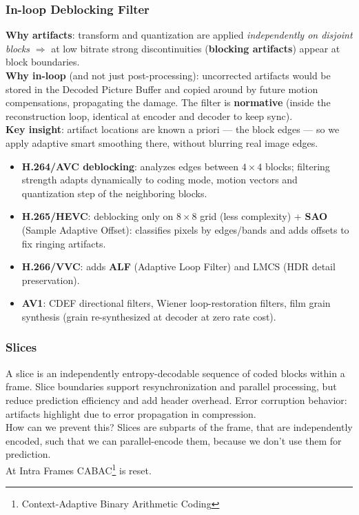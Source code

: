 \subsubsection{In-loop Deblocking Filter}
\textbf{Why artifacts}: transform and quantization are applied \emph{independently on disjoint blocks} $\Rightarrow$ at low bitrate strong discontinuities (\textbf{blocking artifacts}) appear at block boundaries.\\
\textbf{Why in-loop} (and not just post-processing): uncorrected artifacts would be stored in the Decoded Picture Buffer and copied around by future motion compensations, propagating the damage. The filter is \textbf{normative} (inside the reconstruction loop, identical at encoder and decoder to keep sync).\\
\textbf{Key insight}: artifact locations are known a priori --- the block edges --- so we apply adaptive smart smoothing there, without blurring real image edges.
\begin{itemize}
    \item \textbf{H.264/AVC deblocking}: analyzes edges between $4\times4$ blocks; filtering strength adapts dynamically to coding mode, motion vectors and quantization step of the neighboring blocks.
    \item \textbf{H.265/HEVC}: deblocking only on $8\times8$ grid (less complexity) + \textbf{SAO} (Sample Adaptive Offset): classifies pixels by edges/bands and adds offsets to fix ringing artifacts.
    \item \textbf{H.266/VVC}: adds \textbf{ALF} (Adaptive Loop Filter) and LMCS (HDR detail preservation).
    \item \textbf{AV1}: CDEF directional filters, Wiener loop-restoration filters, film grain synthesis (grain re-synthesized at decoder at zero rate cost).
\end{itemize}
\subsubsection{Slices}
A slice is an independently entropy-decodable sequence of coded blocks within a frame. Slice boundaries support resynchronization and parallel processing, but reduce prediction efficiency and add header overhead.
Error corruption behavior: artifacts highlight due to error propagation in compression.\\
How can we prevent this? Slices are subparts of the frame, that are independently encoded, such that we can parallel-encode them, because we don't use them for prediction.\\
At Intra Frames CABAC\footnote{Context-Adaptive Binary Arithmetic Coding} is reset.
